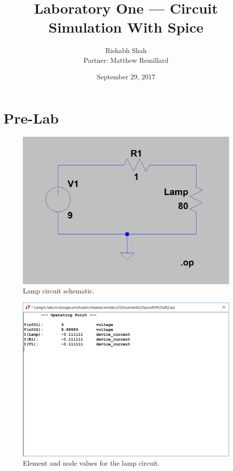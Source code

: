 \documentclass[10pt]{article}
\begin{document}
\title{Laboratory One --- Circuit Simulation With Spice}
\date{September 29, 2017}
\author{Rishabh Shah\\ Partner: Matthew Remillard}
\maketitle

\section*{Pre-Lab}
\begin{figure}[H]
	\centering
		\includegraphics[width=5in]{Capture1}
	\caption{Lamp circuit schematic.}
\end{figure}
\begin{figure}[H]
	\centering
		\includegraphics[width=5in]{Capture}
	\caption{Element and node values for the lamp circuit.}
\end{figure}
\end{document}
